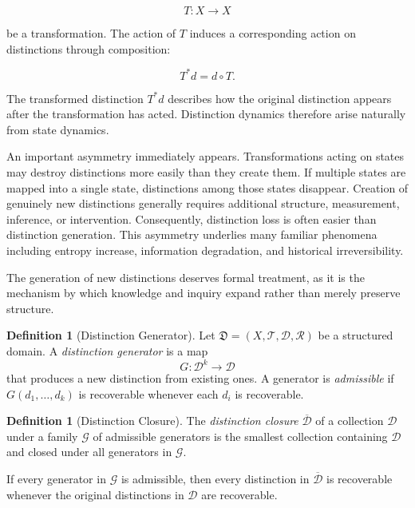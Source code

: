 \documentclass[12pt,oneside]{article}
\theoremstyle{definition}
\newtheorem{definition}[theorem]{Definition} \newtheorem{axiom}[theorem]{Axiom} \newtheorem{remark}[theorem]{Remark} \newtheorem{example}[theorem]{Example}
\begin{document}
\[
T:X\rightarrow X
\]

be a transformation. The action of \(T\) induces a corresponding action on distinctions through composition:

\[
T^*d
=
d\circ T.
\]

The transformed distinction \(T^*d\) describes how the original distinction appears after the transformation has acted. Distinction dynamics therefore arise naturally from state dynamics.

An important asymmetry immediately appears. Transformations acting on states may destroy distinctions more easily than they create them. If multiple states are mapped into a single state, distinctions among those states disappear. Creation of genuinely new distinctions generally requires additional structure, measurement, inference, or intervention. Consequently, distinction loss is often easier than distinction generation. This asymmetry underlies many familiar phenomena including entropy increase, information degradation, and historical irreversibility.

The generation of new distinctions deserves formal treatment, as it is the mechanism by which knowledge and inquiry expand rather than merely preserve structure.

\begin{definition}[Distinction Generator]

Let \(\mathfrak{D} = (X, \mathcal{T}, \mathcal{D}, \mathcal{R})\) be a structured domain. A \emph{distinction generator} is a map
\[
G : \mathcal{D}^k \rightarrow \mathcal{D}
\]
that produces a new distinction from existing ones. A generator is \emph{admissible} if \(G(d_1, \ldots, d_k)\) is recoverable whenever each \(d_i\) is recoverable.

\end{definition}

\begin{definition}[Distinction Closure]

The \emph{distinction closure} \(\overline{\mathcal{D}}\) of a collection \(\mathcal{D}\) under a family \(\mathcal{G}\) of admissible generators is the smallest collection containing \(\mathcal{D}\) and closed under all generators in \(\mathcal{G}\).

\end{definition}

\begin{proposition}

If every generator in \(\mathcal{G}\) is admissible, then every distinction in \(\overline{\mathcal{D}}\) is recoverable whenever the original distinctions in \(\mathcal{D}\) are recoverable.

\end{proposition}
\end{document}
